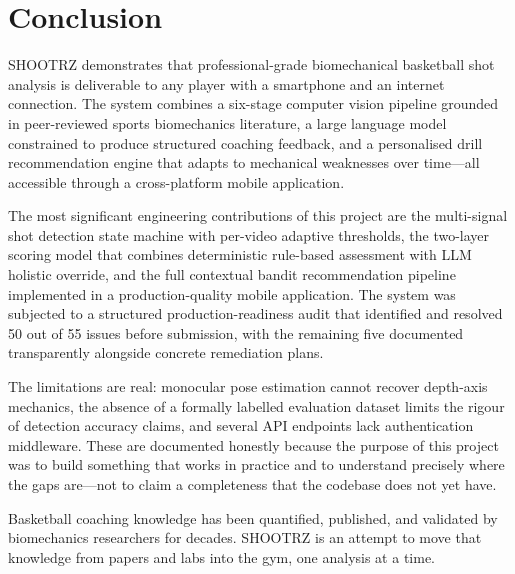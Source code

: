\section{Conclusion}
\label{sec:final_conclusion}

SHOOTRZ demonstrates that professional-grade biomechanical basketball shot analysis is deliverable to any player with a smartphone and an internet connection. The system combines a six-stage computer vision pipeline grounded in peer-reviewed sports biomechanics literature, a large language model constrained to produce structured coaching feedback, and a personalised drill recommendation engine that adapts to mechanical weaknesses over time---all accessible through a cross-platform mobile application.

The most significant engineering contributions of this project are the multi-signal shot detection state machine with per-video adaptive thresholds, the two-layer scoring model that combines deterministic rule-based assessment with LLM holistic override, and the full contextual bandit recommendation pipeline implemented in a production-quality mobile application. The system was subjected to a structured production-readiness audit that identified and resolved 50 out of 55 issues before submission, with the remaining five documented transparently alongside concrete remediation plans.

The limitations are real: monocular pose estimation cannot recover depth-axis mechanics, the absence of a formally labelled evaluation dataset limits the rigour of detection accuracy claims, and several API endpoints lack authentication middleware. These are documented honestly because the purpose of this project was to build something that works in practice and to understand precisely where the gaps are---not to claim a completeness that the codebase does not yet have.

Basketball coaching knowledge has been quantified, published, and validated by biomechanics researchers for decades. SHOOTRZ is an attempt to move that knowledge from papers and labs into the gym, one analysis at a time.
